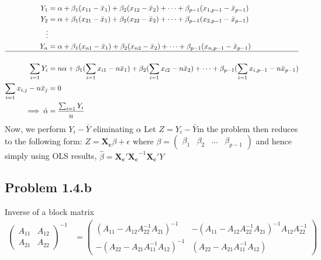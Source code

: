 \documentclass[a4paper]{article}
\begin{document}
\begin{align*}
Y_1 &= \alpha + \beta_1(x_{11}-\bar{x}_1) + \beta_2(x_{12} - \bar{x}_2) + \dots + \beta_{p-1}(x_{1,p-1}-\bar{x}_{p-1})\\
Y_2 &= \alpha + \beta_1(x_{21}-\bar{x}_1) + \beta_2(x_{22} - \bar{x}_2) + \dots + \beta_{p-1}(x_{2,p-1}-\bar{x}_{p-1})\\
\vdots \\
Y_n &= \alpha + \beta_1(x_{n1}-\bar{x}_1) + \beta_2(x_{n2} - \bar{x}_2) + \dots + \beta_{p-1}(x_{n,p-1}-\bar{x}_{p-1})\\
\hline\\
\sum_{i=1}Y_i &= n\alpha + \beta_1(\sum_{i=1}x_{i1}-n\bar{x}_1) + \beta_2(\sum_{i=1}x_{i2}-n\bar{x}_2) + \dots + \beta_{p-1}(\sum_{i=1}x_{i,p-1}-n\bar{x}_{p-1})\\
\sum_{i=1}x_{i,j}-n\bar{x}_j &= 0\\
\implies \hat{\alpha} &= \frac{\sum_{i=1}Y_i}{n}
\end{align*}
Now, we perform $Y_i-\bar{Y}$ eliminating $\alpha$ Let $Z=Y_i-\bar{Y}$m the problem then reduces to the following form: $Z = \mathbf{X_c}\beta + \epsilon$ where $\beta = \begin{pmatrix}
\beta_1 & \beta_2 & \dots & \beta_{p-1}
\end{pmatrix}$ and hence simply using OLS results, $\hat{\beta} =\mathbf{X_c'X_c}^{-1}\mathbf{X_c'}Y$


\subsection*{Problem 1.4.b}
Inverse of a block matrix
\begin{align*}
\begin{pmatrix}
A_{11} & A_{12}\\
A_{21} & A_{22}
\end{pmatrix}^{-1} &= \begin{pmatrix}
(A_{11}-A_{12}A_{22}^{-1}A_{21})^{-1} & -(A_{11}-A_{12}A_{22}^{-1}A_{21})^{-1}A_{12}A_{22}^{-1}\\
-(A_{22}-A_{21}A_{11}^{-1}A_{12})^{-1} & (A_{22}-A_{21}A_{11}^{-1}A_{12})
\end{pmatrix}
\end{align*}
\end{document}
